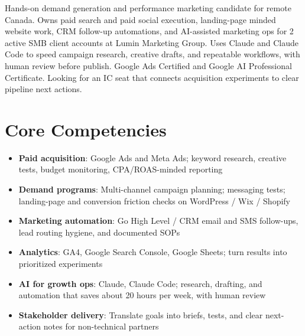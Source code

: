\documentclass[11pt,a4paper,sans]{moderncv}
\begin{document}
\makecvtitle

\vspace{6pt}
\small{Hands-on demand generation and performance marketing candidate for remote Canada. Owns paid search and paid social execution, landing-page minded website work, CRM follow-up automations, and AI-assisted marketing ops for 2 active SMB client accounts at Lumin Marketing Group. Uses Claude and Claude Code to speed campaign research, creative drafts, and repeatable workflows, with human review before publish. Google Ads Certified and Google AI Professional Certificate. Looking for an IC seat that connects acquisition experiments to clear pipeline next actions.}

\section{Core Competencies}
\vspace{1pt}
\begin{itemize}
\item \textbf{Paid acquisition}: Google Ads and Meta Ads; keyword research, creative tests, budget monitoring, CPA/ROAS-minded reporting
\item \textbf{Demand programs}: Multi-channel campaign planning; messaging tests; landing-page and conversion friction checks on WordPress / Wix / Shopify
\item \textbf{Marketing automation}: Go High Level / CRM email and SMS follow-ups, lead routing hygiene, and documented SOPs
\item \textbf{Analytics}: GA4, Google Search Console, Google Sheets; turn results into prioritized experiments
\item \textbf{AI for growth ops}: Claude, Claude Code; research, drafting, and automation that saves about 20 hours per week, with human review
\item \textbf{Stakeholder delivery}: Translate goals into briefs, tests, and clear next-action notes for non-technical partners
\end{itemize}
\end{document}
